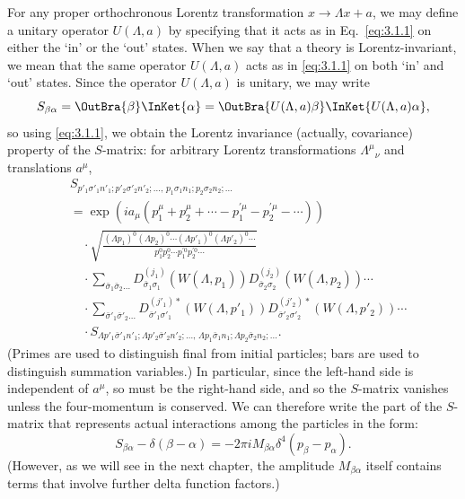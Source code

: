 For any proper orthochronous Lorentz transformation $x\to\Lambda x+a$, we may
define a unitary operator $U(\Lambda,a)$ by specifying that it acts as in
Eq.~\eqref{eq:3.1.1} on either the `in' or the `out' states. When we say that a theory is
Lorentz-invariant, we mean that the same operator $U(\Lambda,a)$ acts as in
\eqref{eq:3.1.1} on both `in' and `out' states. Since the operator $U(\Lambda,a)$ is
unitary, we may write
\[
S_{\beta\alpha}=\OutBra{\beta}\InKet{\alpha}
=\OutBra{U(\Lambda,a)\beta}\InKet{U(\Lambda,a)\alpha},
\]
so using \eqref{eq:3.1.1}, we obtain the Lorentz invariance (actually, covariance)
property of the $S$-matrix: for arbitrary Lorentz transformations
$\Lambda^\mu{}_{\nu}$ and translations $a^\mu$,
\begin{align}
&S_{p'_1\sigma'_1n'_1;p'_2\sigma'_2n'_2;\ldots,\,
p_1\sigma_1n_1;p_2\sigma_2n_2;\ldots}
\nonumber\\
&=\exp\!\left(ia_\mu(p_1^\mu+p_2^\mu+\cdots-p_1^{\prime\mu}-p_2^{\prime\mu}-\cdots)\right)
\nonumber\\
&\quad\cdot\sqrt{\frac{(\Lambda p_1)^0(\Lambda p_2)^0\cdots
(\Lambda p'_1)^0(\Lambda p'_2)^0\cdots}
{p_1^0p_2^0\cdots p_1^{\prime0}p_2^{\prime0}\cdots}}
\nonumber\\
&\quad\cdot\sum_{\bar\sigma_1\bar\sigma_2\ldots}
D^{(j_1)}_{\bar\sigma_1\sigma_1}\!\left(W(\Lambda,p_1)\right)
D^{(j_2)}_{\bar\sigma_2\sigma_2}\!\left(W(\Lambda,p_2)\right)\cdots
\nonumber\\
&\quad\cdot\sum_{\bar\sigma'_1\bar\sigma'_2\ldots}
D^{(j'_1)*}_{\bar\sigma'_1\sigma'_1}\!\left(W(\Lambda,p'_1)\right)
D^{(j'_2)*}_{\bar\sigma'_2\sigma'_2}\!\left(W(\Lambda,p'_2)\right)\cdots
\nonumber\\
&\quad\cdot S_{\Lambda p'_1\bar\sigma'_1n'_1;\Lambda p'_2\bar\sigma'_2n'_2;\ldots,\,
\Lambda p_1\bar\sigma_1n_1;\Lambda p_2\bar\sigma_2n_2;\ldots}.
\tag{3.3.1}\label{eq:3.3.1}
\end{align}
(Primes are used to distinguish final from initial particles; bars are used to
distinguish summation variables.) In particular, since the left-hand side is
independent of $a^\mu$, so must be the right-hand side, and so the $S$-matrix
vanishes unless the four-momentum is conserved. We can therefore write the part
of the $S$-matrix that represents actual interactions among the particles in the
form:
\begin{equation}
S_{\beta\alpha}-\delta(\beta-\alpha)
=-2\pi iM_{\beta\alpha}\delta^4(p_\beta-p_\alpha).
\tag{3.3.2}\label{eq:3.3.2}
\end{equation}
(However, as we will see in the next chapter, the amplitude $M_{\beta\alpha}$
itself contains terms that involve further delta function factors.)

